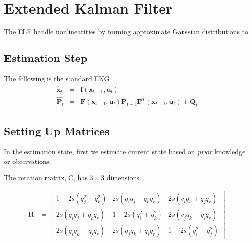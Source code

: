 \documentclass[letterpaper, 10 pt, conference]{ieeeconf}  %
\begin{document}
\section{Extended Kalman Filter}
The ELF handle nonlinearities by forming approximate Gaussian distributions to

\subsection{Estimation Step}
The following is the standard EKG
\begin{equation}
\begin{split}\begin{array}{rcl}
        \hat{\mathbf{x}}_t &=& \mathbf{f}(\mathbf{x}_{t-1}, \mathbf{u}_t) \\
        \hat{\mathbf{P}}_t &=& \mathbf{F}(\mathbf{x}_{t-1}, \mathbf{u}_t)\mathbf{P}_{t-1}\mathbf{F}^T(\mathbf{x}_{t-1}, \mathbf{u}_t) + \mathbf{Q}_t
        \end{array}\end{split}
\end{equation}


\subsection{Setting Up Matrices}
In the estimation state, first we estimate current state based on \textit{prior}
knowledge or observations.

The rotation matrix, C, has \(3 \times 3\) dimensions.

\begin{equation}
\begin{aligned}
\mathbf{R} &=
{\begin{bmatrix}
        1-2s(q_{j}^{2}+q_{k}^{2})&2s(q_{i}q_{j}-q_{k}q_{r})&2s(q_{i}q_{k}+q_{j}q_{r})\\
        2s(q_{i}q_{j}+q_{k}q_{r})&1-2s(q_{i}^{2}+q_{k}^{2})&2s(q_{j}q_{k}-q_{i}q_{r})\\
        2s(q_{i}q_{k}-q_{j}q_{r})&2s(q_{j}q_{k}+q_{i}q_{r})&1-2s(q_{i}^{2}+q_{j}^{2})
\end{bmatrix}}
\end{aligned}
\end{equation}
\end{document}

